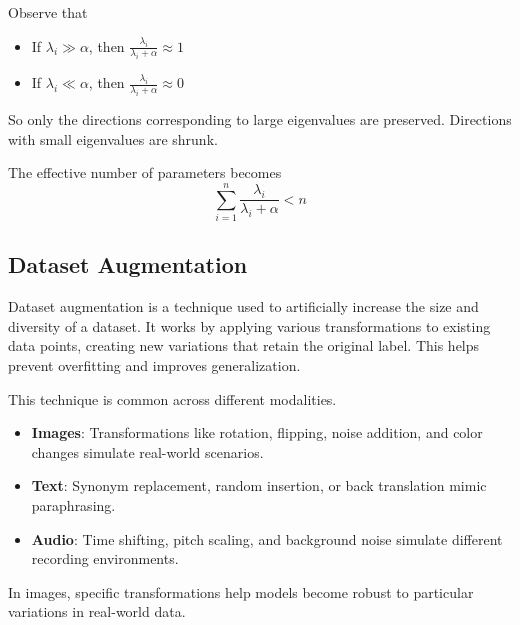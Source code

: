 Observe that
\begin{itemize}
    \item If \( \lambda_i \gg \alpha \), then \( \frac{\lambda_i}{\lambda_i + \alpha} \approx 1 \)
    \item If \( \lambda_i \ll \alpha \), then \( \frac{\lambda_i}{\lambda_i + \alpha} \approx 0 \)
\end{itemize}
So only the directions corresponding to large eigenvalues are preserved. Directions with small eigenvalues are shrunk.

The effective number of parameters becomes
\[
\sum_{i=1}^n \frac{\lambda_i}{\lambda_i + \alpha} < n
\]

\subsection{Dataset Augmentation}

Dataset augmentation is a technique used to artificially increase the size and diversity of a dataset. It works by applying various transformations to existing data points, creating new variations that retain the original label. This helps prevent overfitting and improves generalization.

This technique is common across different modalities. 
\begin{itemize}
    \item \textbf{Images}: Transformations like rotation, flipping, noise addition, and color changes simulate real-world scenarios.
    \item \textbf{Text}: Synonym replacement, random insertion, or back translation mimic paraphrasing.
    \item \textbf{Audio}: Time shifting, pitch scaling, and background noise simulate different recording environments.
\end{itemize}

In images, specific transformations help models become robust to particular variations in real-world data.

